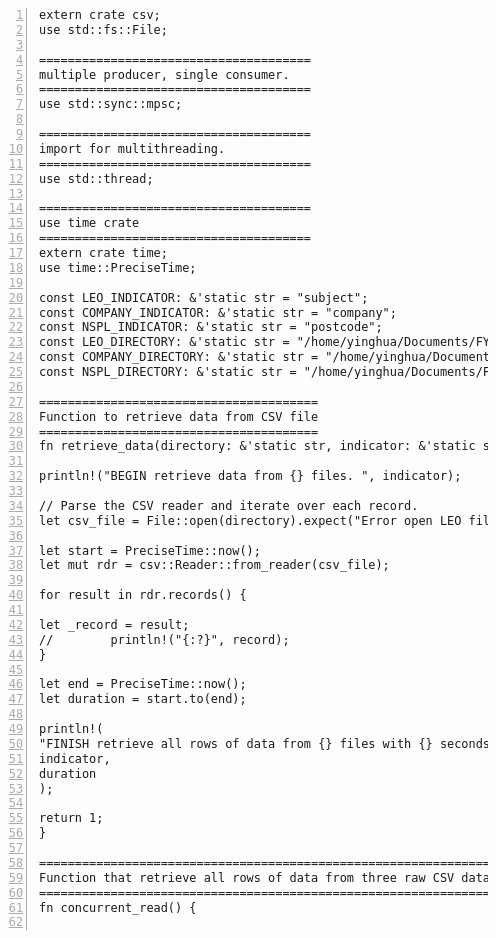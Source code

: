 \lstset{basicstyle=\ttfamily\tiny}  
\begin{lstlisting}[breaklines, frame=single, numbers=left, caption={Rust concurrent program source codes. (main.rs)}, label=commandline-02]
extern crate csv;
use std::fs::File;

======================================
multiple producer, single consumer.
======================================
use std::sync::mpsc;

======================================
import for multithreading. 
======================================
use std::thread;

======================================
use time crate
======================================
extern crate time;
use time::PreciseTime;

const LEO_INDICATOR: &'static str = "subject";
const COMPANY_INDICATOR: &'static str = "company";
const NSPL_INDICATOR: &'static str = "postcode";
const LEO_DIRECTORY: &'static str = "/home/yinghua/Documents/FYP1/FYP-data/subject-data/institution-subject-data.csv";
const COMPANY_DIRECTORY: &'static str = "/home/yinghua/Documents/FYP1/FYP-data/company-data/company-data-full.csv";
const NSPL_DIRECTORY: &'static str = "/home/yinghua/Documents/FYP1/FYP-data/postcode-data/UK-NSPL.csv";

=======================================
Function to retrieve data from CSV file 
=======================================
fn retrieve_data(directory: &'static str, indicator: &'static str) -> u32 {

println!("BEGIN retrieve data from {} files. ", indicator);

// Parse the CSV reader and iterate over each record.
let csv_file = File::open(directory).expect("Error open LEO file");

let start = PreciseTime::now();
let mut rdr = csv::Reader::from_reader(csv_file);

for result in rdr.records() {

let _record = result;
//        println!("{:?}", record);
}

let end = PreciseTime::now();
let duration = start.to(end);

println!(
"FINISH retrieve all rows of data from {} files with {} seconds.",
indicator,
duration
);

return 1;
}

========================================================================================
Function that retrieve all rows of data from three raw CSV datasets in concurrent manner.  
========================================================================================
fn concurrent_read() {


\end{lstlisting}
